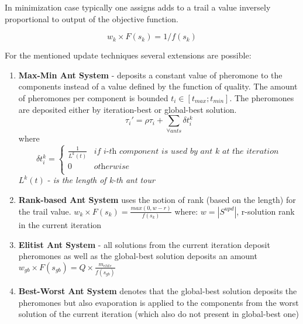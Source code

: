 \documentclass[12pt]{article}
\begin{document}
In minimization case typically one assigns adds to a trail a value inversely proportional to output of the objective function.

\begin{equation}
w_k \times F(s_k) = 1 / f(s_k)
\end{equation}

For the mentioned update techniques several extensions are possible: \\

\begin{enumerate}
\item {\textbf{Max-Min Ant System} - deposits a constant value of pheromone to the components instead of a value defined by the function of quality. The amount of pheromones per component is bounded $t_i \in [t_{max};t_{min}]$. The pheromones are deposited either by iteration-best or global-best solution.}
\begin{equation}
\tau_i' = \rho \tau_i + \sum \limits_{\forall ants} \delta t_i^k
\end{equation}
where
\[
\delta t_i^k =
\left\{
\begin{array}{ll}
      \frac{1}{L^k(t)} & \textit{if i-th component is used by ant k at the iteration}\\
      0 & \textit{otherwise} \\
\end{array} 
\right. 
\]
$L^k(t)$ - \textit{is the length of k-th ant tour}

\item {\textbf{Rank-based Ant System} uses the notion of rank (based on the length) for the trail value.
$w_k \times F(s_k) = \frac{max(0,w-r)}{f(s_k)}$
where: $w=|S^{upd}|$, r-solution rank in the current iteration
}

\item {\textbf{Elitist Ant System} - all solutions from the current iteration deposit pheromones as well as the global-best solution deposits an amount $w_{gb} \times F(s_{gb}) = Q \times \frac{m_{elite}}{f(s_{gb})}$ }

\item {\textbf{Best-Worst Ant System} denotes that the global-best solution deposits the pheromones but also evaporation is applied to the components from the worst solution of the current iteration (which also do not present in global-best one)}

\end{enumerate}

  
\end{document}
